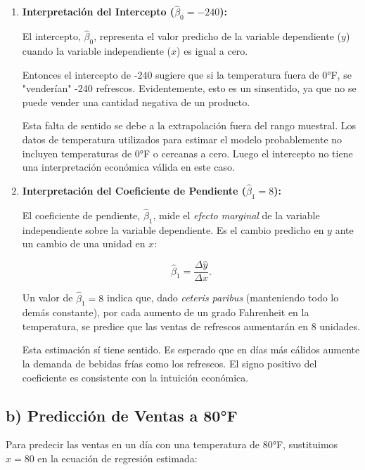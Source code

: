 \documentclass[12pt]{article}
\begin{document}
\begin{enumerate}
    \item \textbf{Interpretación del Intercepto ($\hat{\beta}_0 = -240$):}
    
    El intercepto, $\hat{\beta}_0$, representa el valor predicho de la variable dependiente ($y$) cuando la variable independiente ($x$) es igual a cero.
        
    Entonces el intercepto de -240 sugiere que si la temperatura fuera de 0°F, se "venderían" -240 refrescos. Evidentemente, esto es un sinsentido, ya que no se puede vender una cantidad negativa de un producto.
        
    Esta falta de sentido se debe a la extrapolación fuera del rango muestral. Los datos de temperatura utilizados para estimar el modelo probablemente no incluyen temperaturas de 0°F o cercanas a cero. Luego el intercepto no tiene una interpretación económica válida en este caso.
    
    \item \textbf{Interpretación del Coeficiente de Pendiente ($\hat{\beta}_1 = 8$):}
    
    El coeficiente de pendiente, $\hat{\beta}_1$, mide el \textit{efecto marginal} de la variable independiente sobre la variable dependiente. Es el cambio predicho en $y$ ante un cambio de una unidad en $x$:
    
        \[
        \hat{\beta}_1 = \frac{\Delta \hat{y}}{\Delta x}.
        \]
        
    Un valor de $\hat{\beta}_1 = 8$ indica que, dado \textit{ceteris paribus} (manteniendo todo lo demás constante), por cada aumento de un grado Fahrenheit en la temperatura, se predice que las ventas de refrescos aumentarán en 8 unidades.
        
    Esta estimación sí tiene sentido. Es esperado que en días más cálidos aumente la demanda de bebidas frías como los refrescos. El signo positivo del coeficiente es consistente con la intuición económica.

\end{enumerate}

\subsection*{b) Predicción de Ventas a 80°F}

Para predecir las ventas en un día con una temperatura de 80°F, sustituimos $x = 80$ en la ecuación de regresión estimada:
\end{document}
